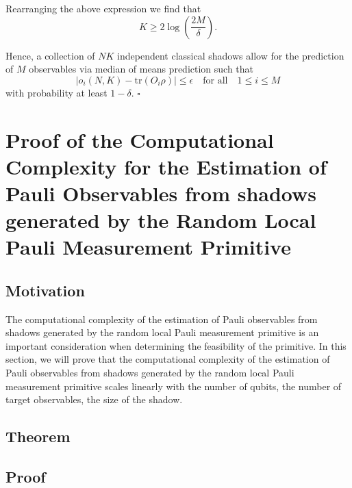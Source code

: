 \documentclass[12pt]{article}
\begin{document}
    Rearranging the above expression we find that
    \begin{equation*}
        K \geq 2\log{\left(\frac{2M}{\delta}\right)}.
    \end{equation*}

    Hence, a collection of $NK$ independent classical shadows allow for the prediction of $M$ observables via median of means prediction such that
    \begin{equation*}
        |\hat{o}_i(N,K) - \text{tr}(O_i\rho)| \leq \epsilon \quad \text{for all} \quad 1 \leq i \leq M
    \end{equation*}
    with probability at least $1-\delta$.
    \hfill $\square$

    \section{Proof of the Computational Complexity for the Estimation of Pauli Observables from shadows generated by the Random Local Pauli Measurement Primitive}

    \subsection{Motivation}
    The computational complexity of the estimation of Pauli observables from shadows generated by the random local Pauli measurement primitive is an important consideration when determining the feasibility of the primitive. In this section, we will prove that the computational complexity of the estimation of Pauli observables from shadows generated by the random local Pauli measurement primitive scales linearly with the number of qubits, the number of target observables, the size of the shadow.

    \subsection{Theorem}

    \subsection{Proof}

    \printbibliography[title={References}]
\end{document}
